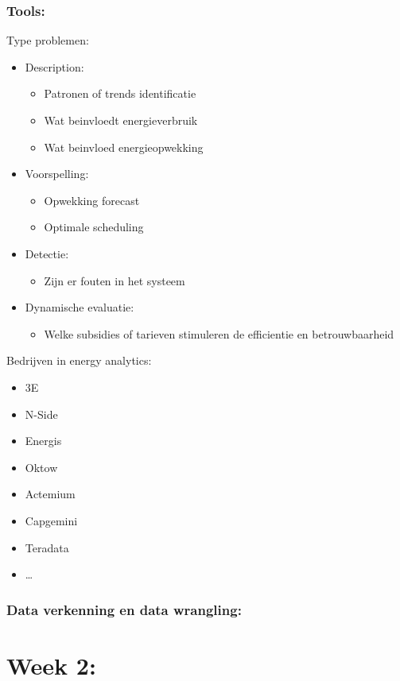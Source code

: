 \documentclass[12pt]{article}
\begin{document}
\subsubsection{Tools:}
Type problemen:\begin{itemize}
    \item Description:\begin{itemize}
        \item Patronen of trends identificatie 
        \item Wat beinvloedt energieverbruik 
        \item Wat beinvloed energieopwekking
    \end{itemize}
    \item Voorspelling:\begin{itemize}
        \item Opwekking forecast 
        \item Optimale scheduling
    \end{itemize} 
    \item Detectie:\begin{itemize}
        \item Zijn er fouten in het systeem
    \end{itemize}
    \item Dynamische evaluatie:\begin{itemize}
        \item Welke subsidies of tarieven stimuleren de efficientie en betrouwbaarheid
    \end{itemize}
\end{itemize}
Bedrijven in energy analytics:\begin{itemize}
    \item 3E 
    \item N-Side 
    \item Energis 
    \item Oktow 
    \item Actemium
    \item Capgemini 
    \item Teradata
    \item \dots 
\end{itemize}
\subsubsection{Data verkenning en data wrangling:}
\section{Week 2:}
\end{document}
